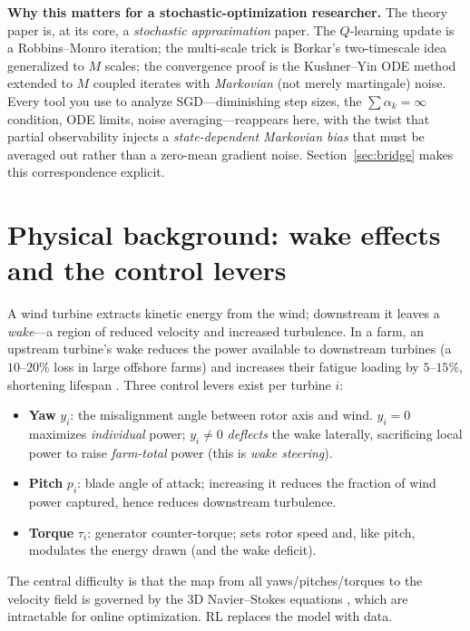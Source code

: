 \documentclass[11pt]{article}
\theoremstyle{plain}
\theoremstyle{definition}
\begin{document}
\noindent\textbf{Why this matters for a stochastic-optimization researcher.}
The theory paper is, at its core, a \emph{stochastic approximation} paper.
The $Q$-learning update is a Robbins--Monro iteration; the multi-scale trick
is Borkar's two-timescale idea \cite{borkar} generalized to $M$ scales; the
convergence proof is the Kushner--Yin ODE method \cite{kushneryin} extended to
$M$ coupled iterates with \emph{Markovian} (not merely martingale) noise.
Every tool you use to analyze SGD---diminishing step sizes, the
$\sum\alpha_k=\infty$ condition, ODE limits, noise averaging---reappears here,
with the twist that partial observability injects a \emph{state-dependent
Markovian bias} that must be averaged out rather than a zero-mean gradient
noise. Section~\ref{sec:bridge} makes this correspondence explicit.

\section{Physical background: wake effects and the control levers}

A wind turbine extracts kinetic energy from the wind; downstream it leaves a
\emph{wake}---a region of reduced velocity and increased turbulence. In a
farm, an upstream turbine's wake reduces the power available to downstream
turbines (a $10$--$20\%$ loss in large offshore farms) and increases their
fatigue loading by $5$--$15\%$, shortening lifespan \cite{P1}. Three control
levers exist per turbine $i$:
\begin{itemize}[leftmargin=1.4em,itemsep=1pt]
  \item \textbf{Yaw} $y_i$: the misalignment angle between rotor axis and wind.
  $y_i=0$ maximizes \emph{individual} power; $y_i\neq 0$ \emph{deflects} the
  wake laterally, sacrificing local power to raise \emph{farm-total} power
  (this is \emph{wake steering}).
  \item \textbf{Pitch} $p_i$: blade angle of attack; increasing it reduces the
  fraction of wind power captured, hence reduces downstream turbulence.
  \item \textbf{Torque} $\tau_i$: generator counter-torque; sets rotor speed
  and, like pitch, modulates the energy drawn (and the wake deficit).
\end{itemize}
The central difficulty is that the map from all yaws/pitches/torques to the
velocity field is governed by the 3D Navier--Stokes equations
\cite{P2}, which are intractable for online optimization. RL replaces the
model with data.
\end{document}
